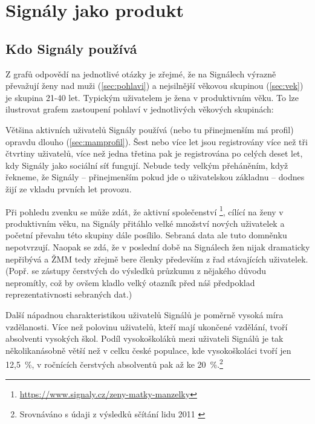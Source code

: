 \section{Signály jako produkt}

\subsection{Kdo Signály používá}

Z grafů odpovědí na jednotlivé otázky je zřejmé,
že na Signálech výrazně převažují ženy nad muži (\ref{sec:pohlavi})
a nejsilnější věkovou skupinou (\ref{sec:vek}) je skupina
21-40 let. Typickým uživatelem je žena v produktivním věku.
To lze ilustrovat grafem zastoupení pohlaví v jednotlivých
věkových skupinách:


Většina aktivních uživatelů Signály používá
(nebo tu přinejmenším má profil) opravdu dlouho (\ref{sec:mamprofil}).
Šest nebo více let jsou registrovány více než tři čtvrtiny uživatelů,
více než jedna třetina pak je registrována po celých deset let,
kdy Signály jako sociální síť fungují. Nebude tedy velkým
přeháněním, když řekneme, že Signály -- přinejmenším pokud
jde o uživatelskou základnu -- dodnes žijí ze vkladu prvních let
provozu.

Při pohledu zvenku se může zdát, že aktivní společenství
\footnote{
  \url{https://www.signaly.cz/zeny-matky-manzelky}},
cílící na ženy v produktivním věku, na Signály přitáhlo
velké množství nových uživatelek a početní převahu této skupiny
dále posílilo. Sebraná data ale tuto domněnku nepotvrzují.
Naopak se zdá, že v poslední době na Signálech žen nijak
dramaticky nepřibývá a ŽMM tedy zřejmě bere členky především
z řad stávajících uživatelek.
(Popř. se zástupy čerstvých  do výsledků
průzkumu z nějakého důvodu nepromítly, což by ovšem kladlo
velký otazník před náš předpoklad reprezentativnosti sebraných dat.)


Další nápadnou charakteristikou uživatelů Signálů je poměrně
vysoká míra vzdělanosti. Více než polovinu uživatelů,
kteří mají ukončené vzdělání, tvoří absolventi vysokých
škol.
Podíl vysokoškoláků mezi uživateli Signálů je tak několikanásobně
větší než v celku české populace, kde vysokoškoláci tvoří jen 12,5~\%,
v ročnících čerstvých absolventů pak až ke 20~\%.\footnote{
  Srovnáváno s údaji z výsledků sčítání lidu 2011
  \cite{sl2011vzdelani}
}

